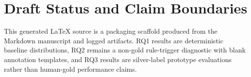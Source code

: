 \documentclass[preprint,review,12pt]{elsarticle}
\begin{document}
\section*{Draft Status and Claim Boundaries}
This generated LaTeX source is a packaging scaffold produced from the Markdown manuscript and logged artifacts. RQ1 results are deterministic baseline distributions, RQ2 remains a non-gold rule-trigger diagnostic with blank annotation templates, and RQ3 results are silver-label prototype evaluations rather than human-gold performance claims.















\end{document}
